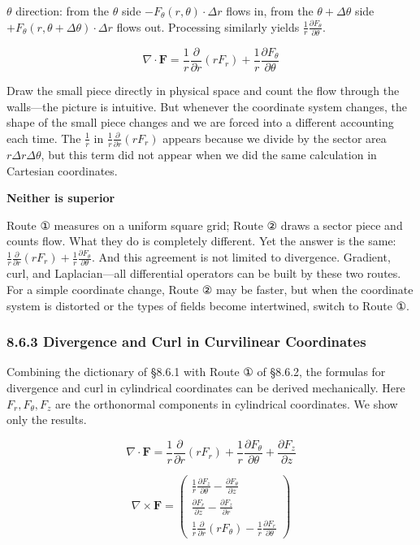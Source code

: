 \(\theta\) direction: from the \(\theta\) side
\(-F_\theta(r,\theta) \cdot \Delta r\) flows in, from the
\(\theta+\Delta\theta\) side
\(+F_\theta(r,\theta+\Delta\theta) \cdot \Delta r\) flows out.
Processing similarly yields
\(\frac{1}{r}\frac{\partial F_\theta}{\partial\theta}\).

\[\nabla \cdot \mathbf{F} = \frac{1}{r}\frac{\partial}{\partial r}(r F_r) + \frac{1}{r}\frac{\partial F_\theta}{\partial \theta}\]

Draw the small piece directly in physical space and count the flow
through the walls---the picture is intuitive. But whenever the
coordinate system changes, the shape of the small piece changes and we
are forced into a different accounting each time. The \(\frac{1}{r}\) in
\(\frac{1}{r}\frac{\partial}{\partial r}(rF_r)\) appears because we
divide by the sector area \(r\Delta r\Delta\theta\), but this term did
not appear when we did the same calculation in Cartesian coordinates.

\textbf{Neither is superior}

Route ① measures on a uniform square grid; Route ② draws a sector piece
and counts flow. What they do is completely different. Yet the answer is
the same:
\(\frac{1}{r}\frac{\partial}{\partial r}(rF_r) + \frac{1}{r}\frac{\partial F_\theta}{\partial\theta}\).
And this agreement is not limited to divergence. Gradient, curl, and
Laplacian---all differential operators can be built by these two routes.
For a simple coordinate change, Route ② may be faster, but when the
coordinate system is distorted or the types of fields become
intertwined, switch to Route ①.

\hypertarget{divergence-and-curl-in-curvilinear-coordinates}{%
\subsubsection{8.6.3 Divergence and Curl in Curvilinear
Coordinates}\label{divergence-and-curl-in-curvilinear-coordinates}}

Combining the dictionary of §8.6.1 with Route ① of §8.6.2, the formulas
for divergence and curl in cylindrical coordinates can be derived
mechanically. Here \(F_r,F_\theta,F_z\) are the orthonormal components
in cylindrical coordinates. We show only the results.

\[\nabla \cdot \mathbf{F} = \frac{1}{r}\frac{\partial}{\partial r}(r F_r) + \frac{1}{r}\frac{\partial F_\theta}{\partial \theta} + \frac{\partial F_z}{\partial z}\]

\[\nabla \times \mathbf{F} = \begin{pmatrix}
\frac{1}{r}\frac{\partial F_z}{\partial \theta} - \frac{\partial F_\theta}{\partial z} \\[0.3em]
\frac{\partial F_r}{\partial z} - \frac{\partial F_z}{\partial r} \\[0.3em]
\frac{1}{r}\frac{\partial}{\partial r}(r F_\theta) - \frac{1}{r}\frac{\partial F_r}{\partial \theta}
\end{pmatrix}\]


